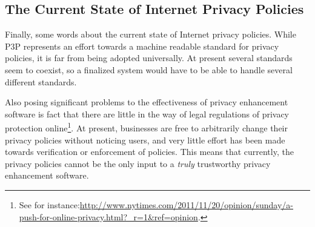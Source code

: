 \subsection{The Current State of Internet Privacy Policies}
Finally, some words about the current state of Internet privacy policies. While P3P represents
an effort towards a machine readable standard for privacy policies, it is far from being adopted
universally. At present several standards seem to coexist, so a finalized system would have to
be able to handle several different standards.

Also posing significant problems to the effectiveness of privacy enhancement software is fact 
that there are little in the way of legal regulations of privacy protection online\footnote{See for instance:\url{http://www.nytimes.com/2011/11/20/opinion/sunday/a-push-for-online-privacy.html?_r=1&ref=opinion}.}.
At present, businesses are free to arbitrarily change their privacy policies without noticing users,
and very little effort has been made towards verification or enforcement of policies. This means that currently,
the privacy policies cannot be the only input to a \emph{truly} trustworthy privacy enhancement software.


